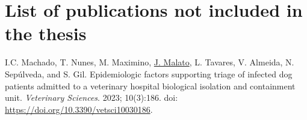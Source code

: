 \section*{List of publications not included in the thesis}
I.C. Machado, T. Nunes, M. Maximino, \underline{J. Malato}, L. Tavares, V. Almeida, N. Sepúlveda, and S. Gil. Epidemiologic factors supporting triage of infected dog patients admitted to a veterinary hospital biological isolation and containment unit.
\textit{Veterinary Sciences}. 2023; 10(3):186. doi: \url{https://doi.org/10.3390/vetsci10030186}.



\vfill
